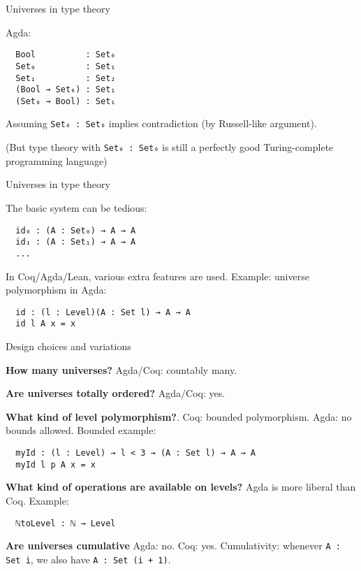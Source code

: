 \documentclass[dvipsnames,10pt,aspectratio=169]{beamer}
\begin{document}
\begin{frame}[fragile]{Universes in type theory}

Agda:
\begin{verbatim}
  Bool          : Set₀
  Set₀          : Set₁
  Set₁          : Set₂
  (Bool → Set₀) : Set₁
  (Set₀ → Bool) : Set₁
\end{verbatim}

Assuming \texttt{Set₀ : Set₀} implies contradiction (by Russell-like argument).
\vspace{1em}

{\small(But type theory with \texttt{Set₀ : Set₀} is still a perfectly good Turing-complete
programming language)}
\vspace{1em}

\end{frame}

\begin{frame}[fragile]{Universes in type theory}

The basic system can be tedious:
\begin{verbatim}
  id₀ : (A : Set₀) → A → A
  id₁ : (A : Set₁) → A → A
  ...
\end{verbatim}

In Coq/Agda/Lean, various extra features are used.
Example: universe polymorphism in Agda:
\begin{verbatim}
  id : (l : Level)(A : Set l) → A → A
  id l A x = x
\end{verbatim}


\end{frame}

\begin{frame}[fragile]{Design choices and variations}

\textbf{How many universes?} Agda/Coq: countably many.
\vspace{1em}

\textbf{Are universes totally ordered?} Agda/Coq: yes.
\vspace{1em}

\textbf{What kind of level polymorphism?}. Coq: bounded polymorphism. Agda: no
bounds allowed. Bounded example:
\begin{verbatim}
  myId : (l : Level) → l < 3 → (A : Set l) → A → A
  myId l p A x = x
\end{verbatim}

\textbf{What kind of operations are available on levels?} Agda is more liberal than Coq. Example:
\begin{verbatim}
  ℕtoLevel : ℕ → Level
\end{verbatim}


\textbf{Are universes cumulative} Agda: no. Coq: yes. Cumulativity: whenever \texttt{A : Set i}, we also have \texttt{A : Set (i + 1)}.

\end{frame}
\end{document}
